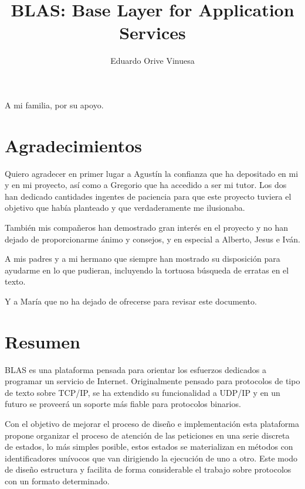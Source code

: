\documentclass[a4paper,spanish,12pt]{book}
\title{BLAS: Base Layer for Application Services}
\author{Eduardo Orive Vinuesa}
\begin{document}


\cleardoublepage




\cleardoublepage

\vspace*{6cm}
	\begin{flushright}
		\begin{em}
			A mi familia, por su apoyo.
       		\end{em}
	\end{flushright}
\cleardoublepage

\chapter*{Agradecimientos}

Quiero agradecer en primer lugar a Agustín la confianza que ha depositado en mi y en mi proyecto, así como a Gregorio que ha accedido a ser mi tutor. Los dos han dedicado cantidades ingentes de paciencia para que este proyecto tuviera el objetivo que había planteado y que verdaderamente me ilusionaba.

Tambi\'en mis compañeros han demostrado gran inter\'es en el proyecto y no han dejado de proporcionarme ánimo y consejos, y en especial a Alberto, Jesus e Iván.

A mis padres y a mi hermano que siempre han mostrado su disposición para ayudarme en lo que pudieran, incluyendo la tortuosa búsqueda de erratas en el texto.

Y a María que no ha dejado de ofrecerse para revisar este documento.
\cleardoublepage

\chapter*{Resumen}
BLAS es una plataforma pensada para orientar los esfuerzos dedicados a programar un servicio de Internet. Originalmente pensado para protocolos de tipo de texto sobre TCP/IP, se ha extendido su funcionalidad a UDP/IP y en un futuro se proveerá un soporte más fiable para protocolos binarios.

Con el objetivo de mejorar el proceso de diseño e implementación esta plataforma propone organizar el proceso de atención de las peticiones en una serie discreta de estados, lo más simples posible, estos estados se materializan en m\'etodos con identificadores unívocos que van dirigiendo la ejecución de uno a otro. Este modo de diseño estructura y facilita de forma considerable el trabajo sobre protocolos con un formato determinado.
\end{document}
